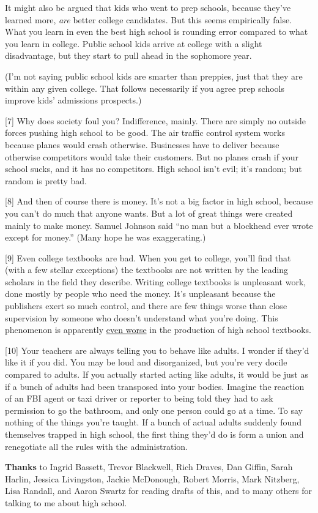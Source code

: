 It might also be argued that kids who went to prep schools, because
they've learned more, \emph{are} better college candidates. But this
seems empirically false. What you learn in even the best high school is
rounding error compared to what you learn in college. Public school kids
arrive at college with a slight disadvantage, but they start to pull
ahead in the sophomore year.

(I'm not saying public school kids are smarter than preppies, just that
they are within any given college. That follows necessarily if you agree
prep schools improve kids' admissions prospects.)

{[}7{]} Why does society foul you? Indifference, mainly. There are
simply no outside forces pushing high school to be good. The air traffic
control system works because planes would crash otherwise. Businesses
have to deliver because otherwise competitors would take their
customers. But no planes crash if your school sucks, and it has no
competitors. High school isn't evil; it's random; but random is pretty
bad.

{[}8{]} And then of course there is money. It's not a big factor in high
school, because you can't do much that anyone wants. But a lot of great
things were created mainly to make money. Samuel Johnson said ``no man
but a blockhead ever wrote except for money.'' (Many hope he was
exaggerating.)

{[}9{]} Even college textbooks are bad. When you get to college, you'll
find that (with a few stellar exceptions) the textbooks are not written
by the leading scholars in the field they describe. Writing college
textbooks is unpleasant work, done mostly by people who need the money.
It's unpleasant because the publishers exert so much control, and there
are few things worse than close supervision by someone who doesn't
understand what you're doing. This phenomenon is apparently
\href{http://www.edutopia.org/muddle-machine}{even worse} in the
production of high school textbooks.

{[}10{]} Your teachers are always telling you to behave like adults. I
wonder if they'd like it if you did. You may be loud and disorganized,
but you're very docile compared to adults. If you actually started
acting like adults, it would be just as if a bunch of adults had been
transposed into your bodies. Imagine the reaction of an FBI agent or
taxi driver or reporter to being told they had to ask permission to go
the bathroom, and only one person could go at a time. To say nothing of
the things you're taught. If a bunch of actual adults suddenly found
themselves trapped in high school, the first thing they'd do is form a
union and renegotiate all the rules with the administration.

\textbf{Thanks} to Ingrid Bassett, Trevor Blackwell, Rich Draves, Dan
Giffin, Sarah Harlin, Jessica Livingston, Jackie McDonough, Robert
Morris, Mark Nitzberg, Lisa Randall, and Aaron Swartz for reading drafts
of this, and to many others for talking to me about high school.
